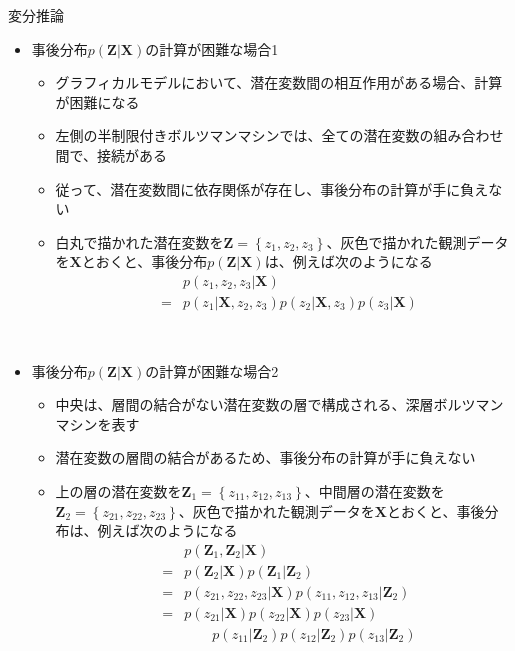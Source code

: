 \documentclass[dvipdfmx,notheorems,t]{beamer}
\begin{document}
\begin{frame}{変分推論}

\begin{itemize}
	\item 事後分布$p(\bm{Z} | \bm{X})$の計算が困難な場合1
	\begin{itemize}
		\item グラフィカルモデルにおいて、\alert{潜在変数間の相互作用がある}場合、計算が困難になる
		\newline
		\item 左側の\alert{半制限付きボルツマンマシン}では、全ての潜在変数の組み合わせ間で、接続がある
		\item 従って、潜在変数間に\alert{依存関係}が存在し、事後分布の計算が手に負えない
		\newline
		\item 白丸で描かれた潜在変数を$\bm{Z} = \left\{ z_1, z_2, z_3 \right\}$、灰色で描かれた観測データを$\bm{X}$とおくと、事後分布$p(\bm{Z} | \bm{X})$は、例えば次のようになる
		\begin{eqnarray}
			&& p(z_1, z_2, z_3 | \bm{X}) \nonumber \\
			&=& p(z_1 | \bm{X}, z_2, z_3) p(z_2 | \bm{X}, z_3) p(z_3 | \bm{X})
		\end{eqnarray}
	\end{itemize} \
	
	\item 事後分布$p(\bm{Z} | \bm{X})$の計算が困難な場合2
	\begin{itemize}
		\item 中央は、層間の結合がない潜在変数の層で構成される、\alert{深層ボルツマンマシン}を表す
		\item 潜在変数の層間の結合があるため、事後分布の計算が手に負えない
		\newline
		\item 上の層の潜在変数を$\bm{Z}_1 = \left\{ z_{11}, z_{12}, z_{13} \right\}$、中間層の潜在変数を$\bm{Z}_2 = \left\{ z_{21}, z_{22}, z_{23} \right\}$、灰色で描かれた観測データを$\bm{X}$とおくと、事後分布は、例えば次のようになる
		\begin{eqnarray}
			&& p(\bm{Z}_1, \bm{Z}_2 | \bm{X}) \nonumber \\
			&=& p(\bm{Z}_2 | \bm{X}) p(\bm{Z}_1 | \bm{Z}_2) \\
			&=& p(z_{21}, z_{22}, z_{23} | \bm{X}) p(z_{11}, z_{12}, z_{13} | \bm{Z}_2) \nonumber \\
			&=& p(z_{21} | \bm{X}) p(z_{22} | \bm{X}) p(z_{23} | \bm{X}) \nonumber \\
			&& \qquad p(z_{11} | \bm{Z}_2) p(z_{12} | \bm{Z}_2) p(z_{13} | \bm{Z}_2)
		\end{eqnarray}
	\end{itemize}
\end{itemize}

\end{frame}
\end{document}
